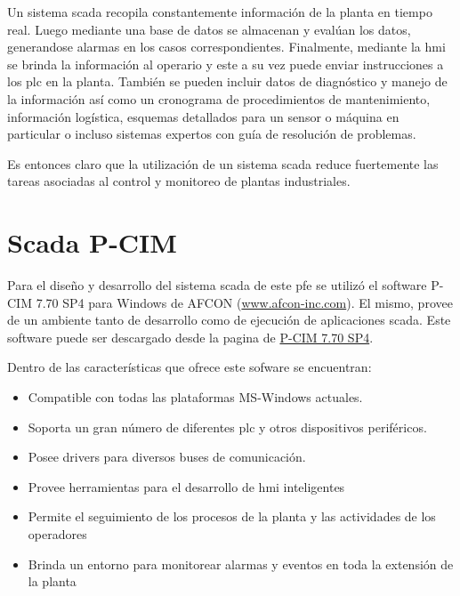 Un sistema \gls{scada} recopila constantemente información de la planta en 
tiempo real. Luego mediante una base de datos se almacenan y evalúan los datos, 
generandose alarmas en los casos correspondientes. Finalmente, mediante 
la \gls{hmi} se brinda la información al operario y este a su vez puede enviar 
instrucciones a los \gls{plc} en la planta. También se pueden incluir datos de 
diagnóstico y manejo de la información así como un cronograma de procedimientos 
de mantenimiento, información logística, esquemas detallados para un sensor o 
máquina en particular o incluso sistemas expertos con guía de resolución de 
problemas. 

Es entonces claro que la utilización de un sistema \gls{scada} reduce 
fuertemente las tareas asociadas al control y monitoreo de plantas industriales.

\section{Scada P-CIM}
\label{sec:ScadaPCIM} 
Para el diseño y desarrollo del sistema \gls{scada} de este \gls{pfe} se 
utilizó el software P-CIM 7.70 SP4 para Windows de AFCON 
(\url{www.afcon-inc.com}). El mismo, provee de un ambiente tanto de desarrollo 
como de ejecución de aplicaciones \gls{scada}. Este software puede ser 
descargado desde la pagina de \href{
http://www.afcon-inc.com/Templates/showpage.asp?TMID=108&FID=733&PID=0&IID=8334}
{P-CIM 7.70 SP4}.

Dentro de las características que ofrece este sofware se encuentran:
\begin{itemize}
 \item Compatible con todas las plataformas MS-Windows actuales.
 \item Soporta un gran número de diferentes \gls{plc} y otros dispositivos 
  periféricos.
 \item Posee drivers para diversos buses de comunicación.
 \item Provee herramientas para el desarrollo de \gls{hmi} inteligentes 
 \item Permite el seguimiento de los procesos de la planta y las actividades de 
 los operadores
 \item Brinda un entorno para monitorear alarmas y eventos en toda la extensión 
 de la planta
\end{itemize}


